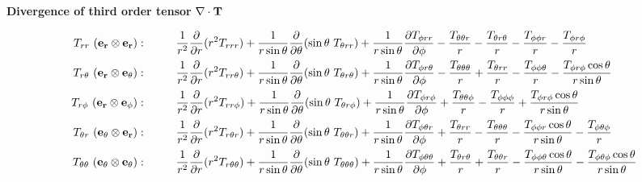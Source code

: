 \documentclass[10pt,paper=a4]{report}
\newcommand{\dr}{\frac{\partial}{\partial r}}
\begin{document}
\noindent
{{\bf{Divergence of third order tensor}} $\nabla \cdot {\bf{T}}$}


\begin{align}
T_{rr} \ ({\bf{e_r \otimes e_r}}): & \hspace{1cm} \frac{1}{r^2}\dr (r^2 T_{rrr}) + \frac{1}{r\sin{\theta}}\frac{\partial}{\partial \theta} (\sin{\theta} \ T_{\theta rr}) + \frac{1}{r\sin{\theta}}\frac{\partial T_{\phi rr}}{\partial \phi} - \frac{T_{\theta\theta r}}{r} - \frac{T_{\theta r \theta}}{r} -\frac{T_{\phi\phi r}}{r} - \frac{T_{\phi r \phi}}{r} \\
T_{r\theta} \ ({\bf{e_r \otimes e_\theta}}): & \hspace{1cm} \frac{1}{r^2}\dr (r^2 T_{rr \theta}) + \frac{1}{r\sin{\theta}}\frac{\partial}{\partial \theta} (\sin{\theta} \ T_{\theta r \theta}) + \frac{1}{r\sin{\theta}}\frac{\partial T_{\phi r \theta}}{\partial \phi} - \frac{T_{\theta \theta \theta}}{r} + \frac{T_{\theta rr}}{r} - \frac{T_{\phi \phi \theta}}{r} - \frac{T_{\phi r \phi} \cos{\theta}}{r\sin{\theta}} \\
T_{r \phi} \ ({\bf{e_r \otimes e_\phi}}): & \hspace{1cm} \frac{1}{r^2}\dr (r^2 T_{rr \phi}) + \frac{1}{r\sin{\theta}}\frac{\partial}{\partial \theta} (\sin{\theta} \ T_{\theta r \phi}) + \frac{1}{r\sin{\theta}}\frac{\partial T_{\phi r \phi}}{\partial \phi} + \frac{T_{\theta \theta \phi}}{r} - \frac{T_{\phi \phi \phi}}{r} + \frac{T_{\phi r \phi} \cos{\theta}}{r\sin{\theta}} \\
T_{\theta r} \ ({\bf{e_\theta \otimes e_r}}): & \hspace{1cm} \frac{1}{r^2}\dr (r^2 T_{r \theta r}) + \frac{1}{r\sin{\theta}}\frac{\partial}{\partial \theta} (\sin{\theta} \ T_{\theta \theta r}) + \frac{1}{r\sin{\theta}}\frac{\partial T_{\phi \theta r}}{\partial \phi} + \frac{T_{\theta rr}}{r} - \frac{T_{\theta \theta \theta}}{r} -\frac{T_{\phi \phi r} \cos{\theta}}{r \sin{\theta}} - \frac{T_{\phi \theta \phi}}{r}  \\
T_{\theta \theta} \ ({\bf{e_\theta \otimes e_\theta}}): & \hspace{1cm} \frac{1}{r^2}\dr (r^2 T_{r \theta \theta}) + \frac{1}{r\sin{\theta}}\frac{\partial}{\partial \theta} (\sin{\theta} \ T_{\theta \theta \theta}) + \frac{1}{r\sin{\theta}}\frac{\partial T_{\phi \theta \theta}}{\partial \phi} + \frac{T_{\theta r \theta}}{r} + \frac{T_{\theta \theta r}}{r} - \frac{T_{\phi \phi \theta} \cos{\theta}}{r\sin{\theta}} - \frac{T_{\phi \theta \phi} \cos{\theta}}{r\sin{\theta}} \\

\end{align}
\end{document}
